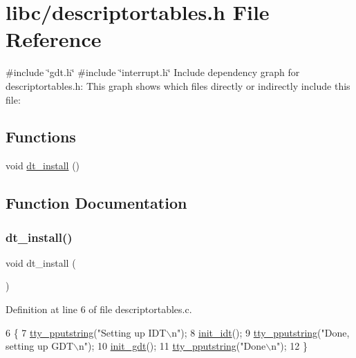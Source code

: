 \hypertarget{a00068}{}\section{libc/descriptortables.h File Reference}
\label{a00068}
{\ttfamily \#include \char`\"{}gdt.\+h\char`\"{}}\newline
{\ttfamily \#include \char`\"{}interrupt.\+h\char`\"{}}\newline
Include dependency graph for descriptortables.\+h\+:
This graph shows which files directly or indirectly include this file\+:
\subsection*{Functions}
\begin{DoxyCompactItemize}
\item 
void \hyperlink{a00068_a4c38e3f3ee100ca4323081bf0970c1ac_a4c38e3f3ee100ca4323081bf0970c1ac}{dt\+\_\+install} ()
\end{DoxyCompactItemize}


\subsection{Function Documentation}
\mbox{\label{a00068_a4c38e3f3ee100ca4323081bf0970c1ac_a4c38e3f3ee100ca4323081bf0970c1ac}} 
\subsubsection{\texorpdfstring{dt\+\_\+install()}{dt\_install()}}
{\footnotesize\ttfamily void dt\+\_\+install (\begin{DoxyParamCaption}{ }\end{DoxyParamCaption})}



Definition at line 6 of file descriptortables.\+c.


\begin{DoxyCode}
6                   \{
7     \hyperlink{a00167_ade960b1320324706aac6c00cc6b1b2fe_ade960b1320324706aac6c00cc6b1b2fe}{tty\_pputstring}(\textcolor{stringliteral}{"Setting up IDT\(\backslash\)n"});
8     \hyperlink{a00101_a35fe413107af682030ab7a4b6dff19b8_a35fe413107af682030ab7a4b6dff19b8}{init\_idt}();
9     \hyperlink{a00167_ade960b1320324706aac6c00cc6b1b2fe_ade960b1320324706aac6c00cc6b1b2fe}{tty\_pputstring}(\textcolor{stringliteral}{"Done, setting up GDT\(\backslash\)n"});
10     \hyperlink{a00095_a86bb50044169930202cc403376ef40c3_a86bb50044169930202cc403376ef40c3}{init\_gdt}();
11     \hyperlink{a00167_ade960b1320324706aac6c00cc6b1b2fe_ade960b1320324706aac6c00cc6b1b2fe}{tty\_pputstring}(\textcolor{stringliteral}{"Done\(\backslash\)n"});
12 \}
\end{DoxyCode}
